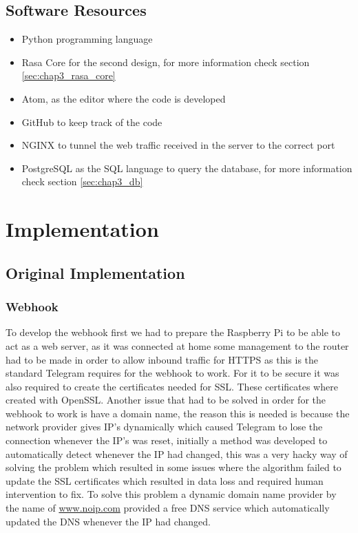 \subsection{Software Resources}\label{sec:chap4_res_back}

\begin{itemize}
	\item {Python programming language}
	\item {Rasa Core for the second design, for more information check section \ref{sec:chap3_rasa_core}}
	\item {Atom, as the editor where the code is developed}
	\item {GitHub to keep track of the code}
	\item {NGINX to tunnel the web traffic received in the server to the correct port}
	\item {PostgreSQL as the SQL language to query the database, for more information check section \ref{sec:chap3_db}}
\end{itemize}

\section{Implementation}\label{sec:chap4_impl}
\subsection{Original Implementation}\label{sec:chap4_ori_imp}
\subsubsection{Webhook}\label{sec:chap4_ori_imp_web}

To develop the webhook first we had to prepare the Raspberry Pi to be able to act as a web server, as it was connected at home some management to the router had to be made in order to allow inbound traffic for HTTPS as this is the standard Telegram requires for the webhook to work. For it to be secure it was also required to create the certificates needed for SSL. These certificates where created with OpenSSL. Another issue that had to be solved in order for the webhook to work is have a domain name, the reason this is needed is because the network provider gives IP’s dynamically which caused Telegram to lose the connection whenever the IP’s was reset, initially a method was developed to automatically detect whenever the IP had changed, this was a very hacky way of solving the problem which resulted in some issues where the algorithm failed to update the SSL certificates which resulted in data loss and required human intervention to fix. To solve this problem a dynamic domain name provider by the name of \url{www.noip.com} provided a free DNS service which automatically updated the DNS whenever the IP had changed.\\

